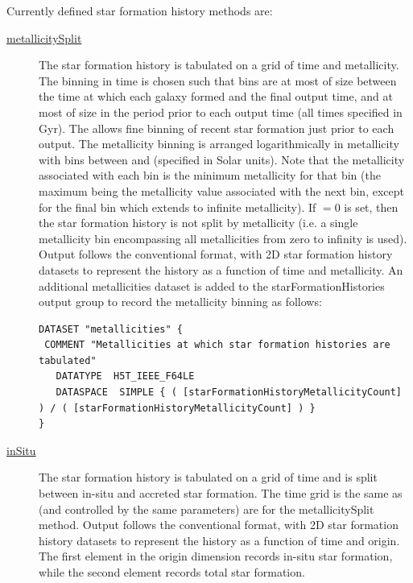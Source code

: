 Currently defined star formation history methods are:
\begin{description}
 \item [\hyperlink{galacticus.output.merger_tree.star_formation.metallicity_split.F90:star_formation_histories_metallicity_split}{{\normalfont \ttfamily metallicitySplit}}] The star formation history is tabulated on a grid of time and metallicity. The binning in time is chosen such that bins are at most of size {\normalfont \ttfamily [starFormationHistoryTimeStep]} between the time at which each galaxy formed and the final output time, and at most of size {\normalfont \ttfamily [starFormationHistoryFineTimeStep]} in the period {\normalfont \ttfamily [starFormationHistoryFineTime]} prior to each output time (all times specified in Gyr). The allows fine binning of recent star formation just prior to each output. The metallicity binning is arranged logarithmically in metallicity with {\normalfont \ttfamily [starFormationHistoryMetallicityCount]} bins between {\normalfont \ttfamily [starFormationHistoryMetallicityMinimum]} and {\normalfont \ttfamily [starFormationHistoryMetallicityMaximum]} (specified in Solar units). Note that the metallicity associated with each bin is the minimum metallicity for that bin (the maximum being the 
metallicity value associated with the next bin, except for the final bin which extends to infinite metallicity). If {\normalfont \ttfamily [starFormationHistoryMetallicityCount]}$=0$ is set, then the star formation history is not split by metallicity (i.e. a single metallicity bin encompassing all metallicities from zero to infinity is used).  Output follows the conventional format, with 2D star formation history datasets to represent the history as a function of time and metallicity. An additional {\normalfont \ttfamily metallicities} dataset is added to the {\normalfont \ttfamily starFormationHistories} output group to record the metallicity binning as follows:
\begin{verbatim}
DATASET "metallicities" {
 COMMENT "Metallicities at which star formation histories are tabulated"
   DATATYPE  H5T_IEEE_F64LE
   DATASPACE  SIMPLE { ( [starFormationHistoryMetallicityCount] ) / ( [starFormationHistoryMetallicityCount] ) }
}
\end{verbatim}
 \item [\hyperlink{galacticus.output.merger_tree.star_formation.in_situ.F90:star_formation_histories_in_situ}{{\normalfont \ttfamily inSitu}}] The star formation history is tabulated on a grid of time and is split between in-situ and accreted star formation. The time grid is the same as (and controlled by the same parameters) are for the {\normalfont \ttfamily metallicitySplit} method. Output follows the conventional format, with 2D star formation history datasets to represent the history as a function of time and origin. The first element in the origin dimension records in-situ star formation, while the second element records total star formation.
\end{description}

